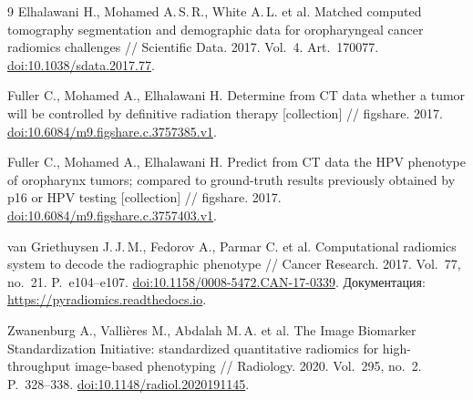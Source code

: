 \documentclass[11pt,a4paper]{article}
\begin{document}
\begin{thebibliography}{9}
Elhalawani H., Mohamed A.\,S.\,R., White A.\,L. et al. Matched computed tomography segmentation and demographic data for oropharyngeal cancer radiomics challenges // Scientific Data. 2017. Vol.~4. Art.~170077. \href{https://doi.org/10.1038/sdata.2017.77}{doi:10.1038/sdata.2017.77}.

Fuller C., Mohamed A., Elhalawani H. Determine from CT data whether a tumor will be controlled by definitive radiation therapy [collection] // figshare. 2017. \href{https://doi.org/10.6084/m9.figshare.c.3757385.v1}{doi:10.6084/m9.figshare.c.3757385.v1}.

Fuller C., Mohamed A., Elhalawani H. Predict from CT data the HPV phenotype of oropharynx tumors; compared to ground-truth results previously obtained by p16 or HPV testing [collection] // figshare. 2017. \href{https://doi.org/10.6084/m9.figshare.c.3757403.v1}{doi:10.6084/m9.figshare.c.3757403.v1}.

van Griethuysen J.\,J.\,M., Fedorov A., Parmar C. et al. Computational radiomics system to decode the radiographic phenotype // Cancer Research. 2017. Vol.~77, no.~21. P.~e104--e107. \href{https://doi.org/10.1158/0008-5472.CAN-17-0339}{doi:10.1158/0008-5472.CAN-17-0339}. Документация: \url{https://pyradiomics.readthedocs.io}.

Zwanenburg A., Vallières M., Abdalah M.\,A. et al. The Image Biomarker Standardization Initiative: standardized quantitative radiomics for high-throughput image-based phenotyping // Radiology. 2020. Vol.~295, no.~2. P.~328--338. \href{https://doi.org/10.1148/radiol.2020191145}{doi:10.1148/radiol.2020191145}.
\end{thebibliography}
\end{document}
